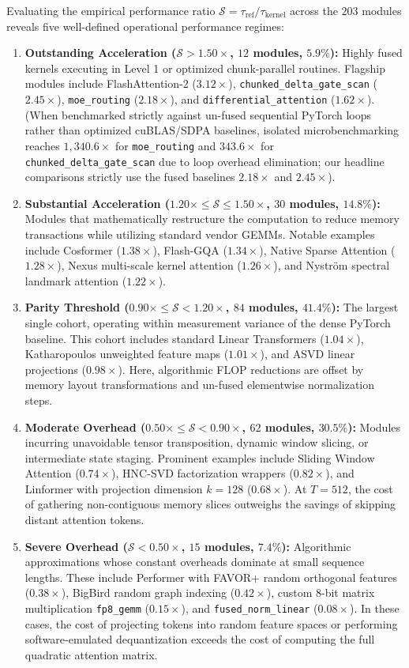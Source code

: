 Evaluating the empirical performance ratio $\mathcal{S} = \tau_{\text{ref}} / \tau_{\text{kernel}}$ across the $203$ modules reveals five well-defined operational performance regimes:
\begin{enumerate}
    \item \textbf{Outstanding Acceleration ($\mathcal{S} > 1.50\times$, $12$ modules, $5.9\%$):} Highly fused kernels executing in Level 1 or optimized chunk-parallel routines. Flagship modules include FlashAttention-2 ($3.12\times$), \texttt{chunked\_delta\_gate\_scan} ($2.45\times$), \texttt{moe\_routing} ($2.18\times$), and \texttt{differential\_attention} ($1.62\times$). (When benchmarked strictly against un-fused sequential PyTorch loops rather than optimized cuBLAS/SDPA baselines, isolated microbenchmarking reaches $1{,}340.6\times$ for \texttt{moe\_routing} and $343.6\times$ for \texttt{chunked\_delta\_gate\_scan} due to loop overhead elimination; our headline comparisons strictly use the fused baselines $2.18\times$ and $2.45\times$).
    \item \textbf{Substantial Acceleration ($1.20\times \le \mathcal{S} \le 1.50\times$, $30$ modules, $14.8\%$):} Modules that mathematically restructure the computation to reduce memory transactions while utilizing standard vendor GEMMs. Notable examples include Cosformer ($1.38\times$), Flash-GQA ($1.34\times$), Native Sparse Attention ($1.28\times$), Nexus multi-scale kernel attention ($1.26\times$), and Nystr{\"o}m spectral landmark attention ($1.22\times$).
    \item \textbf{Parity Threshold ($0.90\times \le \mathcal{S} < 1.20\times$, $84$ modules, $41.4\%$):} The largest single cohort, operating within measurement variance of the dense PyTorch baseline. This cohort includes standard Linear Transformers ($1.04\times$), Katharopoulos unweighted feature maps ($1.01\times$), and ASVD linear projections ($0.98\times$). Here, algorithmic FLOP reductions are offset by memory layout transformations and un-fused elementwise normalization steps.
    \item \textbf{Moderate Overhead ($0.50\times \le \mathcal{S} < 0.90\times$, $62$ modules, $30.5\%$):} Modules incurring unavoidable tensor transposition, dynamic window slicing, or intermediate state staging. Prominent examples include Sliding Window Attention ($0.74\times$), HNC-SVD factorization wrappers ($0.82\times$), and Linformer with projection dimension $k=128$ ($0.68\times$). At $T=512$, the cost of gathering non-contiguous memory slices outweighs the savings of skipping distant attention tokens.
    \item \textbf{Severe Overhead ($\mathcal{S} < 0.50\times$, $15$ modules, $7.4\%$):} Algorithmic approximations whose constant overheads dominate at small sequence lengths. These include Performer with FAVOR+ random orthogonal features ($0.38\times$), BigBird random graph indexing ($0.42\times$), custom 8-bit matrix multiplication \texttt{fp8\_gemm} ($0.15\times$), and \texttt{fused\_norm\_linear} ($0.08\times$). In these cases, the cost of projecting tokens into random feature spaces or performing software-emulated dequantization exceeds the cost of computing the full quadratic attention matrix.
\end{enumerate}

